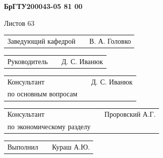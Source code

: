 \vspace{32pt}

\begin{Center}{
\cyrillicfontsf 
\englishfontsf
\bfseries
\fontsize{16pt}{0pt}\selectfont 
    БрГТУ200043-05 81 00
}\end{Center}

\vspace{22pt}

\begin{Center}{
\cyrillicfontsf 
\englishfontsf
\fontsize{16pt}{0pt}\selectfont 
    Листов 63
}\end{Center}

\vspace{22pt}

\begin{FlushLeft} {
\cyrillicfontsf 
\englishfontsf
\fontsize{14pt}{0pt}\selectfont 

  \begin{tabular}{p{6.5cm} p{4.767cm} p{5.633cm}}
    \raggedleft Заведующий кафедрой & & В. А. Головко  
  \end{tabular}

  \vspace{14pt}
  
  \begin{tabular}{p{6.5cm} p{4.767cm} p{5.633cm}}
    \raggedleft Руководитель & & Д. С. Иванюк \\ 
  \end{tabular}

  \vspace{14pt}

  \begin{tabular}{p{6.5cm} p{4.767cm} p{5.633cm}}
    \raggedleft Консультант & & Д. С. Иванюк \\
    \raggedleft по основным вопросам & &
  \end{tabular}

  \vspace{14pt}

  \begin{tabular}{p{6.5cm} p{4.767cm} p{5.633cm}}
    \raggedleft Консультант & & Проровский А.Г. \\
    \raggedleft по экономическому разделу & &
  \end{tabular}

  \vspace{14pt}

  \begin{tabular}{p{6.5cm} p{4.767cm} p{5.633cm}}
    \raggedleft Выполнил & & Кураш А.Ю. \\
  \end{tabular}

}
\end{FlushLeft}
